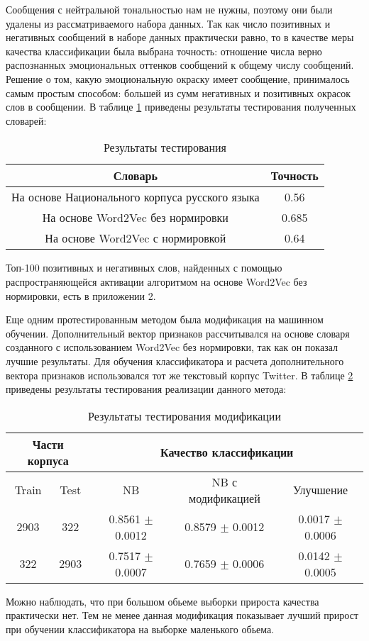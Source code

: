 Сообщения с нейтральной тональностью нам не нужны, поэтому они были удалены из
рассматриваемого набора данных. Так как число позитивных и негативных сообщений
в наборе данных практически равно, то в качестве меры качества
классификации была выбрана точность: отношение числа верно распознанных
эмоциональных оттенков сообщений к общему числу сообщений. Решение о том, какую
эмоциональную окраску имеет сообщение, принималось самым простым способом:
большей из сумм негативных и позитивных окрасок слов в сообщении. В таблице \ref{tab2}
приведены результаты тестирования полученных словарей:

\begin{table}[!h]
\caption{Результаты тестирования}
\label{tab2}
\centering
\begin{tabular}{| c | c |}
  \cline{1-2}
  Словарь & Точность \\\hline
  На основе Национального корпуса русского языка & 0.56 \\
  На основе Word2Vec без нормировки & 0.685\\
  На основе Word2Vec с нормировкой & 0.64 \\
  \cline{1-2}
\end{tabular}
\end{table}

Топ-100 позитивных и негативных слов, найденных с помощью распространяющейся
активации алгоритмом на основе Word2Vec без нормировки, есть в приложении 2.

Еще одним протестированным методом была модификация на машинном обучении.
Дополнительный вектор признаков рассчитывался на основе словаря созданного
с использованием Word2Vec без нормировки, так как он показал лучшие результаты.
Для обучения классификатора и расчета дополнительного вектора признаков
использовался тот же текстовый корпус Twitter. В таблице \ref{tab3} приведены результаты
тестирования реализации данного метода:

\begin{table}[!h]
\caption{Результаты тестирования модификации}
\label{tab3}
\centering
\begin{tabular}{| c | c | c | c | c |}
  \cline{1-5}
  \multicolumn{2}{|c|}{Части корпуса} & \multicolumn{3}{c|}{Качество классификации} \\\hline
  Train & Test & NB & NB с модификацией & Улучшение \\\hline
  2903 & 322 & 0.8561 $\pm$ 0.0012 & 0.8579 $\pm$ 0.0012 & 0.0017 $\pm$ 0.0006\\
  322 & 2903 & 0.7517 $\pm$ 0.0007 & 0.7659 $\pm$ 0.0006 & 0.0142 $\pm$ 0.0005  \\
  \cline{1-5}
\end{tabular}
\end{table}

Можно наблюдать, что при большом обьеме выборки прироста качества практически
нет. Тем не менее данная модификация показывает лучший прирост при
обучении классификатора на выборке маленького обьема.


\FloatBarrier

